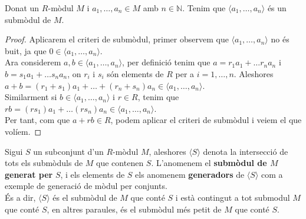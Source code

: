 \begin{lema} Donat un $R$-mòdul $M$ i $a_1,\dots, a_n\in M$ amb $n\in \mathbb{N}$. Tenim que $\langle a_1,\dots, a_n \rangle$ és un submòdul de $M$. 
\end{lema}

\begin{proof}  Aplicarem el criteri de submòdul, primer observem que $\langle a_1,\dots , a_n\rangle $ no és buit, ja que $0\in\langle a_1,\dots , a_n\rangle$. \\
Ara considerem $a,b\in \langle a_1,\dots , a_n\rangle$, per definició tenim que $a=r_1a_1+\dots r_na_n$ i $b=s_1a_1+\dots s_na_n$, on $r_i$ i $s_i$ són elements de $R$ per a $i=1,\dots, n$. Aleshores $a+b=(r_1+s_1)a_1+\dots +(r_n+s_n)a_n\in \langle a_1,\dots , a_n\rangle$. 
\\
Similarment si $b\in \langle a_1,\dots , a_n\rangle$ i $r\in R$, tenim que $rb=(rs_1)a_1+\dots (rs_n)a_n\in \langle a_1,\dots , a_n\rangle$. \\
Per tant, com que $a+rb\in R$, podem aplicar el criteri de submòdul i veiem el que volíem.
\end{proof}


\begin{definition} Sigui $S$ un subconjunt d'un $R$-mòdul $M$, aleshores $\langle S \rangle$ denota la intersecció de tots els submòduls de $M$ que contenen $S$. L'anomenem el \textbf{submòdul de $M$ generat per} $S$, i els elements de $S$ els anomenem \textbf{generadors} de $\langle S \rangle$
com a exemple de generació de mòdul per conjunts. \\
És a dir, $\langle S \rangle $ és el submòdul de $M$ que conté $S$ i està contingut a tot submodul $M$ que conté $S$, en altres paraules, és el submòdul més petit de $M$ que conté $S$.
\end{definition}

